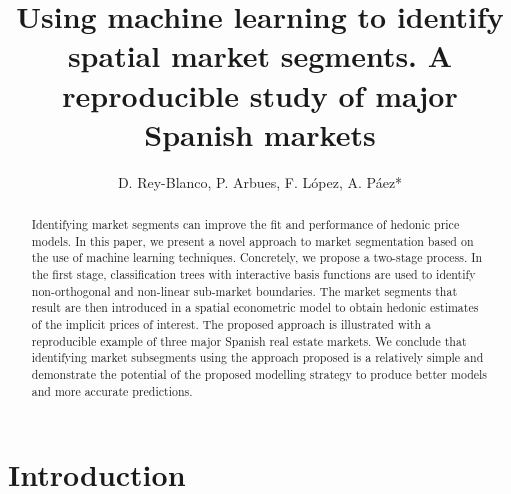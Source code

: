 \documentclass[Royal,times,sageh]{sagej}
\begin{document}

\title{Using machine learning to identify spatial market segments. A
reproducible study of major Spanish markets}


\author{D. Rey-Blanco, P. Arbues, F.
López, A. Páez*}




\begin{abstract}
Identifying market segments can improve the fit and performance of
hedonic price models. In this paper, we present a novel approach to
market segmentation based on the use of machine learning techniques.
Concretely, we propose a two-stage process. In the first stage,
classification trees with interactive basis functions are used to
identify non-orthogonal and non-linear sub-market boundaries. The market
segments that result are then introduced in a spatial econometric model
to obtain hedonic estimates of the implicit prices of interest. The
proposed approach is illustrated with a reproducible example of three
major Spanish real estate markets. We conclude that identifying market
subsegments using the approach proposed is a relatively simple and
demonstrate the potential of the proposed modelling strategy to produce
better models and more accurate predictions.
\end{abstract}


\maketitle

\newpage

\hypertarget{introduction}{%
\section{Introduction}\label{introduction}}
\end{document}
